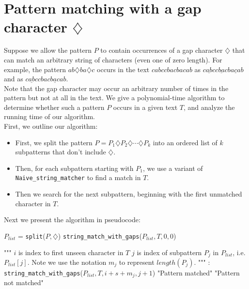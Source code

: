 \documentclass[paper=a4, fontsize=11pt]{scrartcl} %
\numberwithin{equation}{section} %
\numberwithin{figure}{section} %
\numberwithin{table}{section} %
\begin{document}
\section{Pattern matching with a gap character $\diamondsuit$}

Suppose we allow the pattern $P$ to contain occurrences of a gap character $\diamondsuit$ that can match an arbitrary string of characters (even one of zero length). For example, the pattern $ab\diamondsuit ba \diamondsuit c$ occurs in the text $cabccbacbacab$ as $c\underline{ab}cc\underline{ba}cba\underline{c}ab$ and as $c\underline{ab}ccbac\underline{bac}ab$.\\

Note that the gap character may occur an arbitrary number of times in the pattern but not at all in the text. We give a polynomial-time algorithm to determine whether such a pattern $P$ occurs in a given text $T$, and analyze the running time of our algorithm. \\

First, we outline our algorithm:
\begin{itemize}
\item First, we split the pattern $P = P_1 \diamondsuit P_2 \diamondsuit \cdots \diamondsuit P_k$ into an ordered list of $k$ subpatterns that don't include $\diamondsuit$.
\item Then, for each subpattern starting with $P_1$, we use a variant of \texttt{Naive\_string\_matcher} to find a match in $T$.
\item Then we search for the next subpattern, beginning with the first unmatched character in $T$. 
\end{itemize}

Next we present the algorithm in pseudocode:\\

\begin{algorithmic}
\State $P_{list}$ = \texttt{split}($P, \diamondsuit$) 
\State \texttt{string\_match\_with\_gaps}($P_{list}, T, 0, 0$)
\EndFunction
\end{algorithmic}

\begin{algorithmic}
	\State """
	\State $i$ is index to first unseen character in $T$
	\State $j$ is index of subpattern $P_j$ in $P_{list}$, i.e. $P_{list}[j]$.
	\State Note we use the notation $m_j$ to represent $length(P_j)$. 
	\State """
	:
				\State \Return \texttt{string\_match\_with\_gaps}({$P_{list}, T, i + s + m_j, j + 1$})
			\Else
				\State \Return "Pattern matched"
			\EndIf
		\EndIf
	\EndFor
	\State \Return "Pattern not matched" 
\EndFunction
\end{algorithmic}
\end{document}
